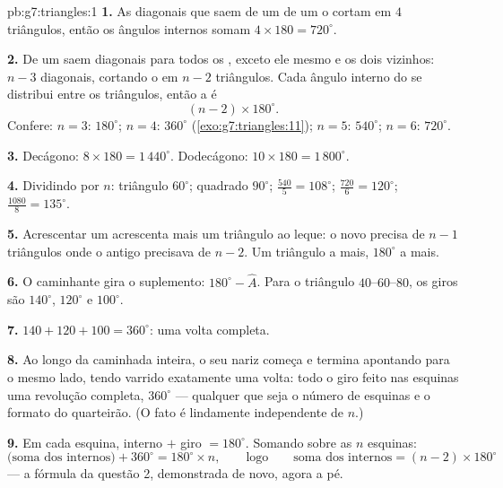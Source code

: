 \begin{solution}{pb:g7:triangles:1}
\textbf{1.} As diagonais que saem de um  de um  o
cortam em $4$ triângulos, então os ângulos internos somam
$4 \times 180 = 720^\circ$.

\textbf{2.} De um  saem diagonais para todos os , exceto
ele mesmo e os dois vizinhos: $n - 3$ diagonais, cortando o  em
$n - 2$ triângulos. Cada ângulo interno do  se distribui entre
os triângulos, então a  é
\[
(n - 2) \times 180^\circ .
\]
Confere: $n = 3$: $180^\circ$; $n = 4$: $360^\circ$
(\cref{exo:g7:triangles:11}); $n = 5$: $540^\circ$; $n = 6$:
$720^\circ$.

\textbf{3.} Decágono: $8 \times 180 = 1\,440^\circ$. Dodecágono:
$10 \times 180 = 1\,800^\circ$.

\textbf{4.} Dividindo por $n$: triângulo $60^\circ$; quadrado
$90^\circ$;  $\frac{540}{5} = 108^\circ$; 
$\frac{720}{6} = 120^\circ$;  $\frac{1080}{8} = 135^\circ$.

\textbf{5.} Acrescentar um  acrescenta mais um triângulo ao
leque: o  novo precisa de $n - 1$ triângulos onde o antigo
precisava de $n - 2$. Um triângulo a mais, $180^\circ$ a mais.

\textbf{6.} O caminhante gira o suplemento: $180^\circ - \widehat A$.
Para o triângulo $40$--$60$--$80$, os giros são $140^\circ$,
$120^\circ$ e $100^\circ$.

\textbf{7.} $140 + 120 + 100 = 360^\circ$: uma volta completa.

\textbf{8.} Ao longo da caminhada inteira, o seu nariz começa e termina
apontando para o mesmo lado, tendo varrido exatamente uma volta: todo o
giro feito nas esquinas  uma revolução completa, $360^\circ$ ---
qualquer que seja o número de esquinas e o formato do quarteirão. (O
fato é lindamente independente de $n$.)

\textbf{9.} Em cada esquina, interno $+$ giro $= 180^\circ$. Somando
sobre as $n$ esquinas:
\[
\text{(soma dos internos)} + 360^\circ = 180^\circ \times n,
\qquad\text{logo}\qquad
\text{soma dos internos} = (n - 2) \times 180^\circ
\]
--- a fórmula da questão 2, demonstrada de novo, agora a pé.


\end{solution}
